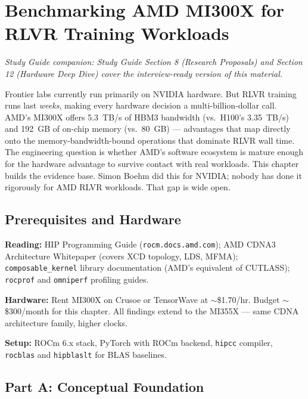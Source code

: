 \section{Benchmarking AMD MI300X for RLVR Training Workloads}

\smallskip\noindent\textit{Study Guide companion: Study Guide Section 8 (Research Proposals) and Section 12 (Hardware Deep Dive) cover the interview-ready version of this material.}
\smallskip

\begin{whythis}
Frontier labs currently run primarily on NVIDIA hardware. But RLVR training runs last \textit{weeks}, making every hardware decision a multi-billion-dollar call. AMD's MI300X offers 5.3~TB/s of HBM3 bandwidth (vs.\ H100's 3.35~TB/s) and 192~GB of on-chip memory (vs.\ 80~GB) --- advantages that map directly onto the memory-bandwidth-bound operations that dominate RLVR wall time. The engineering question is whether AMD's software ecosystem is mature enough for the hardware advantage to survive contact with real workloads. This chapter builds the evidence base. Simon Boehm did this for NVIDIA; nobody has done it rigorously for AMD RLVR workloads. That gap is wide open.
\end{whythis}

\subsection{Prerequisites and Hardware}

\textbf{Reading:} HIP Programming Guide (\texttt{rocm.docs.amd.com}); AMD CDNA3 Architecture Whitepaper (covers XCD topology, LDS, MFMA); \texttt{composable\_kernel} library documentation (AMD's equivalent of CUTLASS); \texttt{rocprof} and \texttt{omniperf} profiling guides.

\textbf{Hardware:} Rent MI300X on Crusoe or TensorWave at $\sim$\$1.70/hr. Budget $\sim$\$300/month for this chapter. All findings extend to the MI355X --- same CDNA architecture family, higher clocks.

\textbf{Setup:} ROCm 6.x stack, PyTorch with ROCm backend, \texttt{hipcc} compiler, \texttt{rocblas} and \texttt{hipblaslt} for BLAS baselines.

\subsection{Part A: Conceptual Foundation}

